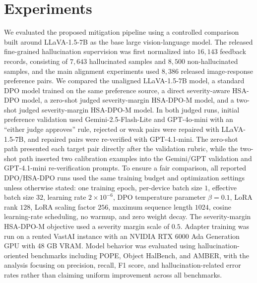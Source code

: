 \documentclass{article}
\begin{document}
\section{Experiments}

We evaluated the proposed mitigation pipeline using a controlled comparison built around LLaVA-1.5-7B as the base large vision-language model. The released fine-grained hallucination supervision was first normalized into $16{,}143$ feedback records, consisting of $7{,}643$ hallucinated samples and $8{,}500$ non-hallucinated samples, and the main alignment experiments used $8{,}386$ released image-response preference pairs. We compared the unaligned LLaVA-1.5-7B model, a standard DPO model trained on the same preference source, a direct severity-aware HSA-DPO model, a zero-shot judged severity-margin HSA-DPO-M model, and a two-shot judged severity-margin HSA-DPO-M model. In both judged runs, initial preference validation used Gemini-2.5-Flash-Lite and GPT-4o-mini with an ``either judge approves'' rule, rejected or weak pairs were repaired with LLaVA-1.5-7B, and repaired pairs were re-verified with GPT-4.1-mini. The zero-shot path presented each target pair directly after the validation rubric, while the two-shot path inserted two calibration examples into the Gemini/GPT validation and GPT-4.1-mini re-verification prompts. To ensure a fair comparison, all reported DPO/HSA-DPO runs used the same training budget and optimization settings unless otherwise stated: one training epoch, per-device batch size $1$, effective batch size $32$, learning rate $2\times10^{-6}$, DPO temperature parameter $\beta=0.1$, LoRA rank $128$, LoRA scaling factor $256$, maximum sequence length $1024$, cosine learning-rate scheduling, no warmup, and zero weight decay. The severity-margin HSA-DPO-M objective used a severity margin scale of $0.5$. Adapter training was run on a rented VastAI instance with an NVIDIA RTX 6000 Ada Generation GPU with 48 GB VRAM. Model behavior was evaluated using hallucination-oriented benchmarks including POPE, Object HalBench, and AMBER, with the analysis focusing on precision, recall, F1 score, and hallucination-related error rates rather than claiming uniform improvement across all benchmarks.

\begin{table}[t]
  \centering
  \caption{Judged-preference construction statistics for the zero-shot and two-shot HSA-DPO-M paths. Initial validation checks released preference pairs, LLaVA repairs rejected pairs, and GPT-4.1-mini re-verifies repaired pairs before final training.}
  \label{tab:pipeline-stats}
  \small
\end{table}
\end{document}

